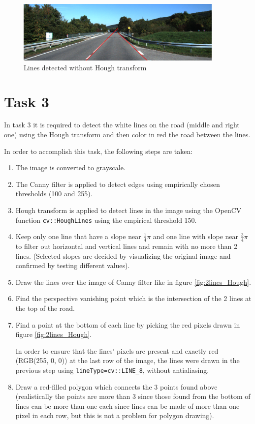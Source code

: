 \documentclass{article}
\begin{document}
\begin{figure}[H]
	\centering
	\includegraphics[width=0.9\textwidth]{street_scene_linesNoHough.png}
	\caption{Lines detected without Hough transform}
	\label{fig:lines_noHough}
\end{figure}



\section*{Task 3}
In task 3 it is required to detect the white lines on the road (middle and right one) using the Hough transform and then color in red the road between the lines.

In order to accomplish this task, the following steps are taken:
\begin{enumerate}
	\item The image is converted to grayscale.
	\item The Canny filter is applied to detect edges using empirically chosen thresholds (100 and 255).
	\item Hough transform is applied to detect lines in the image using the OpenCV function \texttt{cv::HoughLines} using the empirical threshold 150.
	\item Keep only one line that have a slope near $\frac{1}{4} \pi$ and one line with slope near $\frac{3}{4} \pi$ to filter out horizontal and vertical lines and remain with no more than 2 lines. (Selected slopes are decided by visualizing the original image and confirmed by testing different values).
	\item Draw the lines over the image of Canny filter like in figure \ref{fig:2lines_Hough}.
	\item Find the perspective vanishing point which is the intersection of the 2 lines at the top of the road.
	\item Find a point at the bottom of each line by picking the red pixels drawn in figure \ref{fig:2lines_Hough}.

	In order to ensure that the lines' pixels are present and exactly red (RGB(255, 0, 0)) at the last row of the image, the lines were drawn in the previous step using \texttt{lineType=cv::LINE\_8}, without antialiasing.
	\item Draw a red-filled polygon which connects the 3 points found above (realistically the points are more than 3 since those found from the bottom of lines can be more than one each since lines can be made of more than one pixel in each row, but this is not a problem for polygon drawing).
\end{enumerate}
\end{document}

